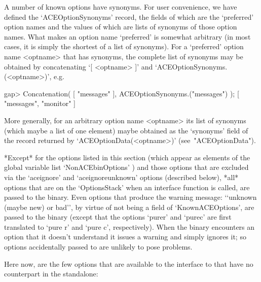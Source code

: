 
A number of known {\ACE} options have synonyms. For user  convenience,
we     have      defined      the      `ACEOptionSynonyms'{\undoquotes
{}} record, the  fields
of which are the \lq{}preferred' option names and the values of  which
are lists of synonyms of those option names. What makes an option name
\lq{}preferred' is somewhat arbitrary (in most cases, it is simply the
shortest of a list of synonyms). For  a  \lq{}preferred'  option  name
<optname> that has synonyms, the complete  list  of  synonyms  may  be
obtained     by     concatenating     `[     <optname>     ]'      and
`ACEOptionSynonyms.(<optname>)', e.g.

\beginexample
gap> Concatenation( [ "messages" ], ACEOptionSynonyms.("messages") );
[ "messages", "monitor" ]
\endexample

More generally, for an arbitrary option name  <optname>  its  list  of
synonyms (which maybe a list of one element)  maybe  obtained  as  the
`synonyms' field of the record returned by  `ACEOptionData(<optname>)'
(see~"ACEOptionData").


*Except* for the options listed  in  this  section  (which  appear  as
elements of the global  variable  list  `NonACEbinOptions'{\undoquotes
{}})  and  those  options
that are excluded via the `aceignore' and  `aceignoreunknown'  options
(described below), *all* options that are on the  `OptionsStack'  when
an {\ACE} interface function is  called,  are  passed  to  the  {\ACE}
binary. Even options that produce the warning  message:  \lq{}`unknown
(maybe  new)  or  bad'',  by  virtue  of  not   being   a   field   of
`KnownACEOptions', are passed to the {\ACE} binary  (except  that  the
options `purer' and `purec' are first translated to `pure r' and `pure
c', respectively). When the {\ACE} binary encounters an option that it
doesn't understand it issues a  warning  and  simply  ignores  it;  so
options accidentally passed to {\ACE} are unlikely to pose problems.

Here now, are the  few  options  that  are  available  to  the  {\GAP}
interface to {\ACE} that have no counterpart in the {\ACE} standalone:

\beginitems

